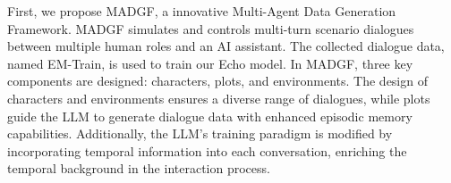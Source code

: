 First, we propose MADGF, a innovative Multi-Agent Data Generation Framework. MADGF simulates and controls multi-turn scenario dialogues between multiple human roles and an AI assistant. The collected dialogue data, named EM-Train, is used to train our Echo model.
In MADGF, three key components are designed: characters, plots, and environments. The design of characters and environments ensures a diverse range of dialogues, while plots guide the LLM to generate dialogue data with enhanced episodic memory capabilities. Additionally, the LLM's training paradigm is modified by incorporating temporal information into each conversation, enriching the temporal background in the interaction process.

